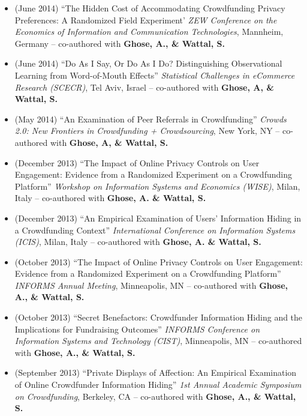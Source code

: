 \documentclass[10.5pt,letterpaper,sans]{moderncv}        %
\begin{document}
\begin{itemize}
\item (June 2014) ``The Hidden Cost of Accommodating Crowdfunding Privacy Preferences: A Randomized Field Experiment' \textit{ZEW Conference on the Economics of Information and Communication Technologies}, Mannheim, Germany -- co-authored with \textbf{Ghose, A., \& Wattal, S.}

\item (June 2014) ``Do As I Say, Or Do As I Do? Distinguishing Observational Learning from Word-of-Mouth Effects'' \textit{Statistical Challenges in eCommerce Research (SCECR)}, Tel Aviv, Israel -- co-authored with \textbf{Ghose, A, \& Wattal, S.}

\item (May 2014) ``An Examination of Peer Referrals in Crowdfunding'' \textit{Crowds 2.0: New Frontiers in Crowdfunding + Crowdsourcing}, New York, NY -- co-authored with \textbf{Ghose, A, \& Wattal, S.}

\item (December 2013) ``The Impact of Online Privacy Controls on User Engagement: Evidence from a Randomized Experiment on a Crowdfunding Platform'' \textit{Workshop on Information Systems and Economics (WISE)}, Milan, Italy -- co-authored with \textbf{Ghose, A. \& Wattal, S.}

\item (December 2013) ``An Empirical Examination of Users' Information Hiding in a Crowdfunding Context'' \textit{International Conference on Information Systems (ICIS)}, Milan, Italy -- co-authored with \textbf{Ghose, A. \& Wattal, S.}

\item (October 2013) ``The Impact of Online Privacy Controls on User Engagement: Evidence from a Randomized Experiment on a Crowdfunding Platform'' \textit{INFORMS Annual Meeting}, Minneapolis, MN -- co-authored with \textbf{Ghose, A., \& Wattal, S.}

\item (October 2013) ``Secret Benefactors: Crowdfunder Information Hiding and the Implications for Fundraising Outcomes'' \textit{INFORMS Conference on Information Systems and Technology (CIST)}, Minneapolis, MN -- co-authored with \textbf{Ghose, A., \& Wattal, S.}

\item (September 2013) ``Private Displays of Affection: An Empirical Examination of Online Crowdfunder Information Hiding'' \textit{1st Annual Academic Symposium on Crowdfunding}, Berkeley, CA -- co-authored with \textbf{Ghose, A., \& Wattal, S.}


\end{itemize}
\end{document}
